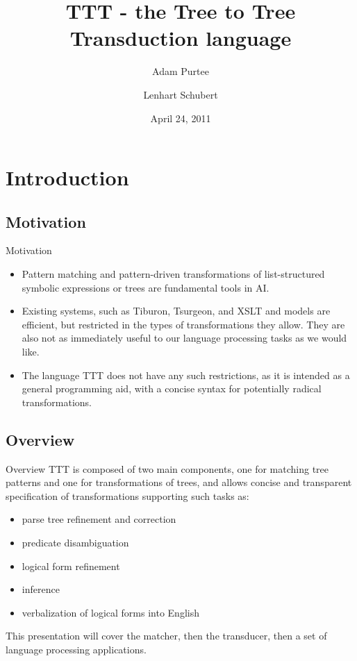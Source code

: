 \documentclass[8pt]{beamer}
\title[TTT]{TTT - the Tree to Tree Transduction language}
\author{Adam Purtee \and Lenhart Schubert}
\date{April 24, 2011}
\institute[University of Rochester]{
  Department of Computer Science\\
  University of Rochester\\
  Rochester, NY, USA\\
  \{apurtee,schubert\}@cs.rochester.edu
}
\begin{document}
\maketitle
\section{Introduction}
\subsection{Motivation}
\begin {frame} {Motivation}
\begin{itemize}
\item Pattern matching and pattern-driven transformations of list-structured symbolic expressions or trees are fundamental tools in AI. \\

\item Existing systems, such as Tiburon, Tsurgeon, and XSLT and models are efficient, but restricted in the types of transformations they allow.  They are also not as immediately useful to our language processing tasks as we would like.

\item The language TTT does not have any such restrictions, as it is intended as a general programming aid, with a concise syntax for potentially radical transformations.
\end{itemize}
\end{frame}
\subsection{Overview}
\begin{frame}{Overview}
TTT is composed of two main components, one for matching tree patterns and one for transformations of trees, and allows concise and transparent specification of transformations supporting such tasks as:
  \begin{itemize}
  \item parse tree refinement and correction
  \item predicate disambiguation
  \item logical form refinement
  \item inference
  \item verbalization of logical forms into English
  \end{itemize}
This presentation will cover the matcher, then the transducer, then a set of language processing applications. 
\end{frame}
\end{document}
